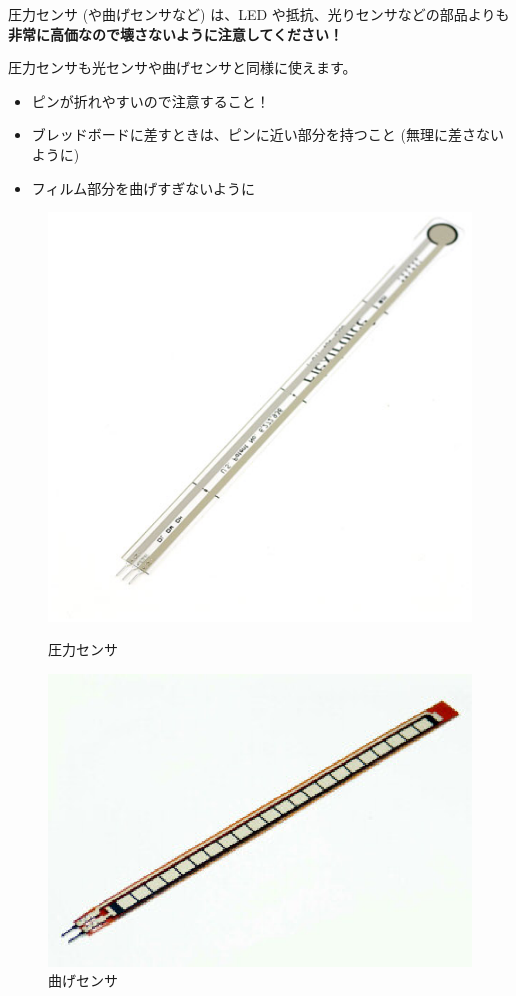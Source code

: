 \documentclass[11pt,a4paper]{jarticle}
\begin{document}

圧力センサ (や曲げセンサなど) は、LED や抵抗、光りセンサなどの部品よりも\textbf{非常に高価なので壊さないように注意してください！}

圧力センサも光センサや曲げセンサと同様に使えます。
\begin{itemize}
 \item ピンが折れやすいので注意すること！
 \item ブレッドボードに差すときは、ピンに近い部分を持つこと (無理に差さないように)
 \item フィルム部分を曲げすぎないように
\end{itemize}

\begin{figure}[h!]
 \begin{minipage}{0.5\columnwidth}
  \centering
  \includegraphics[width=\columnwidth]{img/pressure_sensor.eps}
  \caption{圧力センサ}
 \end{minipage}
 \begin{minipage}{0.5\columnwidth}
  \centering
  \includegraphics[width=\columnwidth]{img/flex_sensor.eps}
  \caption{曲げセンサ}
 \end{minipage}
\end{figure}
\end{document}
